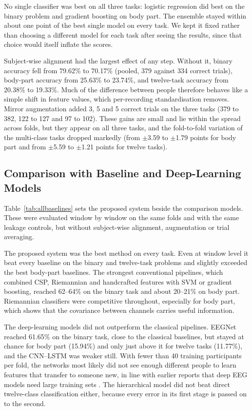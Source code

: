 \documentclass[pdflatex,sn-mathphys-num]{sn-jnl}%
\theoremstyle{thmstyleone}%
\theoremstyle{thmstyletwo}%
\theoremstyle{thmstylethree}%
\begin{document}
No single classifier was best on all three tasks: logistic regression did best on the binary problem and gradient boosting on body part. The ensemble stayed within about one point of the best single model on every task. We kept it fixed rather than choosing a different model for each task after seeing the results, since that choice would itself inflate the scores.

Subject-wise alignment had the largest effect of any step. Without it, binary accuracy fell from 79.62\% to 70.17\% (pooled, 379 against 334 correct trials), body-part accuracy from 25.63\% to 23.74\%, and twelve-task accuracy from 20.38\% to 19.33\%. Much of the difference between people therefore behaves like a simple shift in feature values, which per-recording standardisation removes. Mirror augmentation added 3, 5 and 5 correct trials on the three tasks (379 to 382, 122 to 127 and 97 to 102). These gains are small and lie within the spread across folds, but they appear on all three tasks, and the fold-to-fold variation of the multi-class tasks dropped markedly (from $\pm$3.59 to $\pm$1.79 points for body part and from $\pm$5.59 to $\pm$1.21 points for twelve tasks).

\subsection{Comparison with Baseline and Deep-Learning Models}\label{subsec:baselines}

Table~\ref{tab:allbaselines} sets the proposed system beside the comparison models. These were evaluated window by window on the same folds and with the same leakage controls, but without subject-wise alignment, augmentation or trial averaging.



The proposed system was the best method on every task. Even at window level it beat every baseline on the binary and twelve-task problems and slightly exceeded the best body-part baselines. The strongest conventional pipelines, which combined CSP, Riemannian and handcrafted features with SVM or gradient boosting, reached 62--64\% on the binary task and about 20--21\% on body part. Riemannian classifiers were competitive throughout, especially for body part, which shows that the covariance between channels carries useful information.

The deep-learning models did not outperform the classical pipelines. EEGNet reached 61.65\% on the binary task, close to the classical baselines, but stayed at chance for body part (15.94\%) and only just above it for twelve tasks (11.77\%), and the CNN--LSTM was weaker still. With fewer than 40 training participants per fold, the networks most likely did not see enough different people to learn features that transfer to someone new, in line with earlier reports that deep EEG models need large training sets \citep{Roy2019,Altaheri2023}. The hierarchical model did not beat direct twelve-class classification either, because every error in its first stage is passed on to the second.
\end{document}
